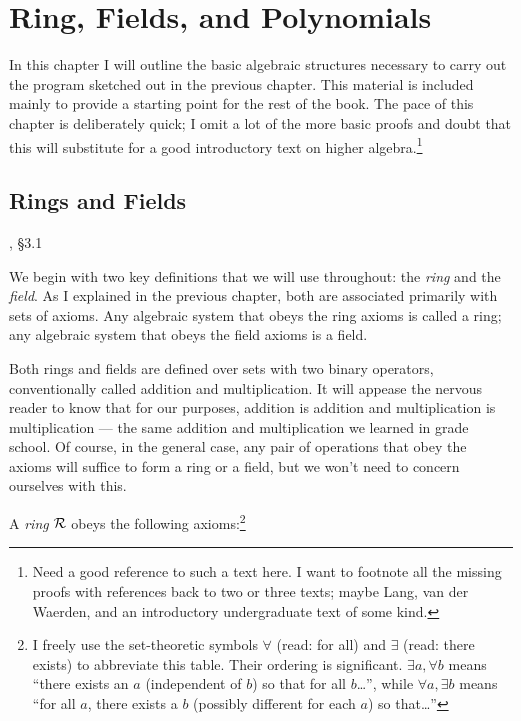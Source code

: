 
\chapter{Ring, Fields, and Polynomials}

In this chapter I will outline the basic algebraic structures
necessary to carry out the program sketched out in the previous
chapter.  This material is included mainly to provide a starting point
for the rest of the book. The pace of this chapter is
deliberately quick; I omit a lot of the more basic proofs and doubt
that this will substitute for a good introductory text on higher
algebra.\footnote{Need a good reference to such a text here.
I want to footnote all the missing proofs with references
back to two or three texts; maybe Lang, van der Waerden,
and an introductory undergraduate text of some kind.}

\section{Rings and Fields}
, \S3.1

We begin with two key definitions that we will use throughout: the
{\it ring} and the {\it field}.  As I explained in the previous
chapter, both are associated primarily with sets of axioms.  Any
algebraic system that obeys the ring axioms is called a ring; any
algebraic system that obeys the field axioms is a field.

Both rings and fields are defined over sets with two binary operators,
conventionally called addition and multiplication.  It will appease
the nervous reader to know that for our purposes,
addition is addition and multiplication is multiplication --- the same
addition and multiplication we learned in grade school.  Of
course, in the general case, any pair of operations that obey the
axioms will suffice to form a ring or a field, but we won't need to
concern ourselves with this.

A {\it ring} ${\cal R}$ obeys the following axioms:\footnote{I freely
use the set-theoretic symbols $\forall$ (read: for all) and $\exists$
(read: there exists) to abbreviate this table.  Their ordering
is significant.  $\exists a, \forall b$ means ``there exists an
$a$ (independent of $b$) so that for all $b$\ldots'', while
$\forall a, \exists b$ means ``for all $a$, there exists a $b$
(possibly different for each $a$) so that\ldots''}


